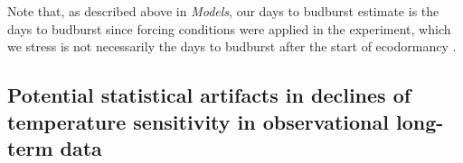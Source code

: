 \documentclass{article}
\begin{document}
\par Note that, as described above in \emph{Models}, our days to budburst estimate is the days to budburst since forcing conditions were applied in the experiment, which we stress is not necessarily the days to budburst after the start of ecodormancy \emph{\citep{chuine2016}}.




 



\subsection*{Potential statistical artifacts in declines of temperature sensitivity in observational long-term data} %
\end{document}
